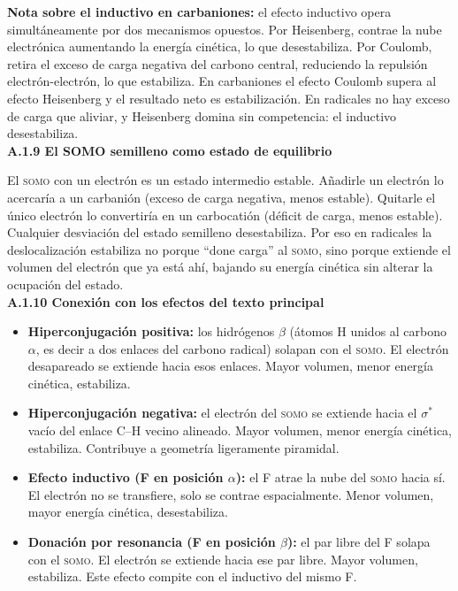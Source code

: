 \textbf{Nota sobre el inductivo en carbaniones:} el efecto inductivo opera simultáneamente por
dos mecanismos opuestos. Por Heisenberg, contrae la nube electrónica aumentando la energía cinética,
lo que desestabiliza. Por Coulomb, retira el exceso de carga negativa del carbono central,
reduciendo la repulsión electrón-electrón, lo que estabiliza. En carbaniones el efecto Coulomb
supera al efecto Heisenberg y el resultado neto es estabilización. En radicales no hay exceso de
carga que aliviar, y Heisenberg domina sin competencia: el inductivo desestabiliza. \\

\label{sec:anexo:tom:somo}
\textbf{A.1.9 El SOMO semilleno como estado de equilibrio}

El \textsc{somo} con un electrón es un estado intermedio estable. Añadirle un electrón lo acercaría
a un carbanión (exceso de carga negativa, menos estable). Quitarle el único electrón lo convertiría
en un carbocatión (déficit de carga, menos estable). Cualquier desviación del estado semilleno
desestabiliza. Por eso en radicales la deslocalización estabiliza no porque ``done carga'' al
\textsc{somo}, sino porque extiende el volumen del electrón que ya está ahí, bajando su energía
cinética sin alterar la ocupación del estado. \\

\label{sec:anexo:tom:conexion}
\textbf{A.1.10 Conexión con los efectos del texto principal}

\begin{itemize}
\item \textbf{Hiperconjugación positiva:} los hidrógenos $\beta$ (átomos H unidos al carbono
$\alpha$, es decir a dos enlaces del carbono radical) solapan con el \textsc{somo}. El electrón
desapareado se extiende hacia esos enlaces. Mayor volumen, menor energía cinética, estabiliza.
\item \textbf{Hiperconjugación negativa:} el electrón del \textsc{somo} se extiende hacia el
$\sigma^*$ vacío del enlace C--H vecino alineado. Mayor volumen, menor energía cinética,
estabiliza. Contribuye a geometría ligeramente piramidal.
\item \textbf{Efecto inductivo (F en posición $\alpha$):} el F atrae la nube del \textsc{somo}
hacia sí. El electrón no se transfiere, solo se contrae espacialmente. Menor volumen, mayor
energía cinética, desestabiliza.
\item \textbf{Donación por resonancia (F en posición $\beta$):} el par libre del F solapa con
el \textsc{somo}. El electrón se extiende hacia ese par libre. Mayor volumen, estabiliza. Este
efecto compite con el inductivo del mismo F.
\end{itemize}

